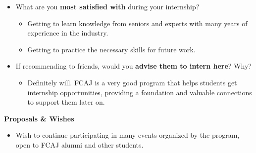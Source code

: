 \begin{itemize}
\tightlist
\item
  What are you \textbf{most satisfied with} during your internship?

  \begin{itemize}
  \tightlist
  \item
    Getting to learn knowledge from seniors and experts with many years
    of experience in the industry.
  \item
    Getting to practice the necessary skills for future work.
  \end{itemize}
\item
  If recommending to friends, would you \textbf{advise them to intern
  here}? Why?

  \begin{itemize}
  \tightlist
  \item
    Definitely will. FCAJ is a very good program that helps students get
    internship opportunities, providing a foundation and valuable
    connections to support them later on.
  \end{itemize}
\end{itemize}

\vspace{0.5em}\noindent\textbf{Proposals \& Wishes}\par

\begin{itemize}
\tightlist
\item
  Wish to continue participating in many events organized by the
  program, open to FCAJ alumni and other students.
\end{itemize}
